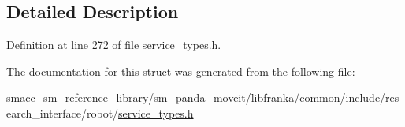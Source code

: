 \subsection{Detailed Description}


Definition at line 272 of file service\+\_\+types.\+h.



The documentation for this struct was generated from the following file\+:\begin{DoxyCompactItemize}
\item 
smacc\+\_\+sm\+\_\+reference\+\_\+library/sm\+\_\+panda\+\_\+moveit/libfranka/common/include/research\+\_\+interface/robot/\hyperlink{service__types_8h}{service\+\_\+types.\+h}\end{DoxyCompactItemize}
